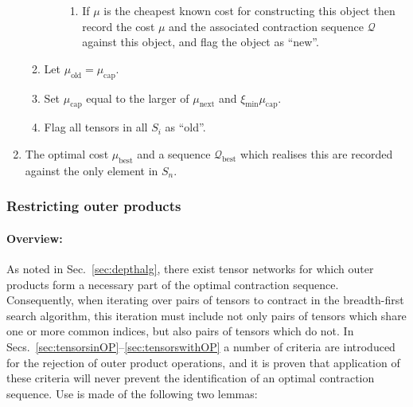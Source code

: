 \documentclass[aps,pre,reprint,superscriptaddress,amsfonts,amsmath,showpacs,nofootinbib,floatfix]{revtex4-1}
\newcommand{\mrm}[1]{\mathrm{#1}}
\newcommand{\mc}[1]{\mathcal{#1}}
\newcommand{\sref}[1]{Sec.~\ref{#1}}
\begin{document}
\begin{enumerate}
\begin{enumerate}
\begin{enumerate}
\begin{enumerate}
\item If $\mu$ is the cheapest known cost for constructing this object then record the cost $\mu$ and the associated contraction sequence $\mc{Q}$ against this object, and flag the object as ``new''.
\end{enumerate}
\end{enumerate}
\item Let $\mu_\mrm{old}=\mu_\mrm{cap}$.
\item Set $\mu_\mrm{cap}$ equal to the larger of $\mu_\mrm{next}$ and $\xi_\mrm{min}\mu_\mrm{cap}$.
\item Flag all tensors in all $S_i$ as ``old''.
\end{enumerate}
\item The optimal cost $\mu_\mrm{best}$ and a sequence $\mc{Q}_\mrm{best}$ which realises this are recorded against the only element in $S_n$.
\end{enumerate}





\subsubsection{Restricting outer products\label{sec:restrictops}}

\paragraph{Overview:\label{sec:roverview}}
As noted in \sref{sec:depthalg}, there exist tensor networks for which outer products form a necessary part of the optimal contraction sequence. Consequently, when iterating over pairs of tensors to contract in the breadth-first search algorithm, this iteration must include not only pairs of tensors which share one or more common indices, but also pairs of tensors which do not. 
In Secs.~\ref{sec:tensorsinOP}--\ref{sec:tensorswithOP} a number of criteria are introduced for the rejection of outer product operations, and it is proven that application of these criteria will never prevent the identification of an optimal contraction sequence. Use is made of the following two lemmas: %
\end{document}
